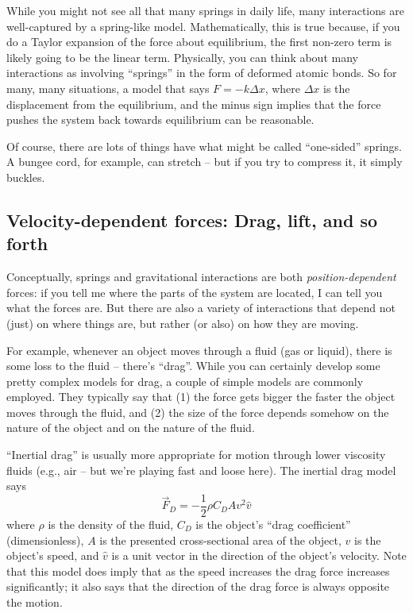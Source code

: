 While you might not see all that many springs in daily life, many interactions are well-captured by a spring-like model.  Mathematically, this is true because, if you do a Taylor expansion of the force about equilibrium, the first non-zero term is likely going to be the linear term.  Physically, you can think about many interactions as involving ``springs'' in the form of deformed atomic bonds.  So for many, many situations, a model that says $F=-k\Delta x$, where $\Delta x$ is the displacement from the equilibrium, and the minus sign implies that the force pushes the system back towards equilibrium can be reasonable.

Of course, there are lots of things have what might be called ``one-sided'' springs.  A bungee cord, for example, can stretch -- but if you try to compress it, it simply buckles. 

\subsection{Velocity-dependent forces: Drag, lift, and so forth}
Conceptually, springs and gravitational interactions are both {\it position-dependent} forces:  if you tell me where the parts of the system are located, I can tell you what the forces are.  But there are also a variety of interactions that depend not (just) on where things are, but rather (or also) on how they are moving.

For example, whenever an object moves through a fluid (gas or liquid), there is some loss to the fluid -- there's ``drag''.   While you can certainly develop some pretty complex models for drag, a couple of simple models are commonly employed.  They typically say that (1) the force gets bigger the faster the object moves through the fluid, and (2) the size of the force depends somehow on the nature of the object and on the nature of the fluid.

``Inertial drag'' is usually more appropriate for motion through lower viscosity fluids (e.g., air -- but we're playing fast and loose here).  The inertial drag model says 
$$\vec{F}_{D} = -\frac{1}{2} \rho C_D A v^2 \hat{v}$$
where $\rho$ is the density of the fluid, $C_D$ is the object's ``drag coefficient'' (dimensionless), $A$ is the presented cross-sectional area of the object, $v$ is the object's speed, and $\hat{v}$ is a unit vector in the direction of the object's velocity.  Note that this model does imply that as the speed increases the drag force increases significantly; it also says that the direction of the drag force is always opposite the motion.

